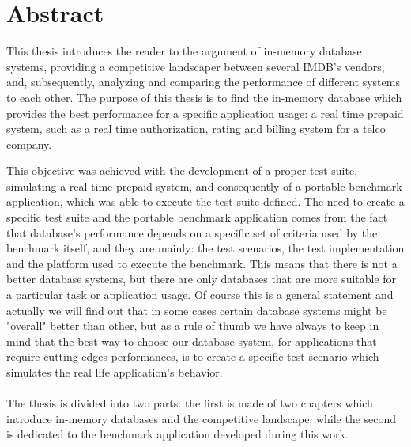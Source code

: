 \chapter{Abstract}


This thesis introduces the reader to the argument of in-memory database systems, providing a competitive landscaper between several IMDB's vendors, and, subsequently, analyzing and comparing the performance of different systems to each other. 
The purpose of this thesis is to find the in-memory database which provides the best performance for a specific application usage: a real time prepaid system, such as a real time authorization, rating and billing system for a telco company.


This objective was achieved with the development of a proper test suite, simulating a real time prepaid system, and consequently of a portable benchmark application, which was able to execute the test suite defined. 
The need to create a specific test suite and the portable benchmark application comes from the fact that database's performance depends on a specific set of criteria used by the benchmark itself, and they are mainly: the test scenarios, the test implementation and the platform used to execute the benchmark.
This means that there is not a better database systems, but there are only databases that are more suitable for a particular task or application usage. Of course this is a general statement and actually we will find out that in some cases certain database systems might be "overall" better than other, but as a rule of thumb we have always to keep in mind that the best way to choose our database system, for applications that require cutting edges performances, is to create a specific test scenario which simulates the real life application's behavior.

\subsubsection{}

The thesis is divided into two parts: the first is made of two chapters which introduce in-memory databases and the competitive landscape, while the second is dedicated to the benchmark application developed during this work.

